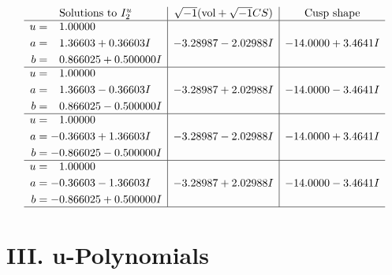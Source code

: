 \documentclass[1p]{elsarticle_modified}
\theoremstyle{definition}
\newcommand{\I}{\sqrt{-1}}
\begin{document}
$$\begin{array}{c|c|c}  
\text{Solutions to }I^u_{2}& \I (\text{vol} + \sqrt{-1}CS) & \text{Cusp shape}\\
 \hline 
\begin{aligned}
u &= \phantom{-}1.00000\phantom{ +0.000000I} \\
a &= \phantom{-}1.36603 + 0.36603 I \\
b &= \phantom{-}0.866025 + 0.500000 I\end{aligned}
 & -3.28987 - 2.02988 I & -14.0000 + 3.4641 I \\ \hline\begin{aligned}
u &= \phantom{-}1.00000\phantom{ +0.000000I} \\
a &= \phantom{-}1.36603 - 0.36603 I \\
b &= \phantom{-}0.866025 - 0.500000 I\end{aligned}
 & -3.28987 + 2.02988 I & -14.0000 - 3.4641 I \\ \hline\begin{aligned}
u &= \phantom{-}1.00000\phantom{ +0.000000I} \\
a &= -0.36603 + 1.36603 I \\
b &= -0.866025 - 0.500000 I\end{aligned}
 & -3.28987 - 2.02988 I & -14.0000 + 3.4641 I \\ \hline\begin{aligned}
u &= \phantom{-}1.00000\phantom{ +0.000000I} \\
a &= -0.36603 - 1.36603 I \\
b &= -0.866025 + 0.500000 I\end{aligned}
 & -3.28987 + 2.02988 I & -14.0000 - 3.4641 I\\
 \hline 
 \end{array}$$\newpage
\newpage\renewcommand{\arraystretch}{1}
\centering \section*{ III. u-Polynomials}
\end{document}
